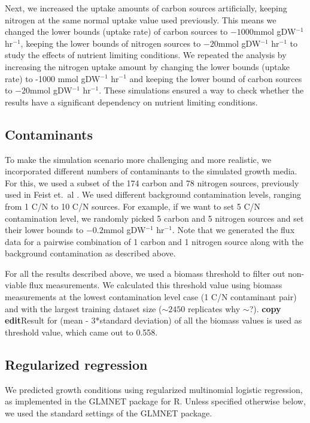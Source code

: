 \documentclass[12pt]{article}
\begin{document}
Next, we increased the uptake amounts of carbon sources artificially, keeping nitrogen at the same normal uptake value used previously. This means we changed the lower bounds (uptake rate) of carbon sources to $-1000$mmol gDW$^{-1}$ hr$^{-1}$, keeping the lower bounds of nitrogen sources to $-20$mmol gDW$^{-1}$ hr$^{-1}$ to study the effects of nutrient limiting conditions. We repeated the analysis by increasing the nitrogen uptake amount by changing the lower bounds (uptake rate) to -1000 mmol gDW$^{-1}$ hr$^{-1}$ and keeping the lower bound of carbon sources to $-20$mmol gDW$^{-1}$ hr$^{-1}$. These simulations ensured a way to check whether the results have a significant dependency on nutrient limiting conditions.

\subsection*{Contaminants}
To make the simulation scenario more challenging and more realistic, we incorporated different numbers of contaminants to the simulated growth media. For this, we used a subset of the 174 carbon and 78 nitrogen sources, previously used in Feist et.\ al \cite{Feistetal2007}.  We used different background contamination levels, ranging from 1 C/N to 10 C/N sources. For example, if we want to set 5 C/N contamination level, we randomly picked 5 carbon and 5 nitrogen sources and set their lower bounds to $-0.2$mmol gDW$^{-1}$ hr$^{-1}$. Note that we generated the flux data for a pairwise combination of 1 carbon and 1 nitrogen source along with the background contamination as described above. 

For all the results described above, we used a biomass threshold to filter out non-viable flux measurements. We calculated this threshold value using biomass measurements at the lowest contamination level case (1 C/N contaminant pair) and with the largest training dataset size ($\sim2450$ replicates {\color{red}why $\sim$?}). {\color{red}\textbf{copy edit}Result for (mean - 3*standard deviation) of all the biomass values is used as threshold value, which came out to 0.558.}

\subsection*{Regularized regression}

We predicted growth conditions using regularized multinomial logistic regression, as implemented in the GLMNET package \cite{Friedmanetal2010} for R. Unless specified otherwise below, we used the standard settings of the GLMNET package.
\end{document}
